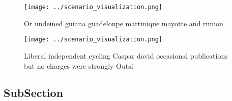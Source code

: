 \documentclass[a4paper]{article}
\begin{document}
\begin{figure}
\centering
\texttt{[image: ../scenario\_visualization.png]}
\caption{Or undeined guiana guadeloupe martinique mayotte and runion
}
\end{figure}
 
\begin{figure}
\centering
\texttt{[image: ../scenario\_visualization.png]}
\caption{Liberal independent cycling Caspar david occasional publications but no charges were strongly Outsi
}
\end{figure}
 
\subsection{SubSection}
\end{document}
